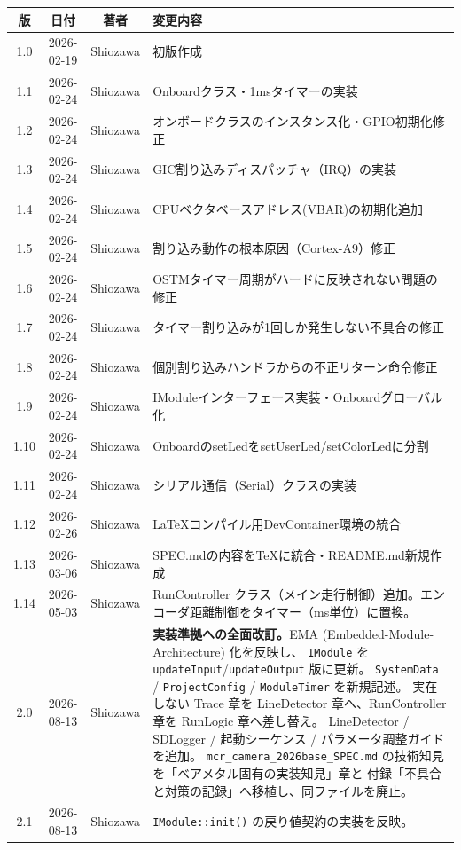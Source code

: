 \documentclass[a4paper,11pt,dvipdfmx]{jsarticle}
\begin{document}
\begin{tabularx}{\textwidth}{c c c X}
\toprule
\textbf{版} & \textbf{日付} & \textbf{著者} & \textbf{変更内容} \\
\midrule
1.0  & 2026-02-19 & Shiozawa & 初版作成 \\
1.1  & 2026-02-24 & Shiozawa & Onboardクラス・1msタイマーの実装 \\
1.2  & 2026-02-24 & Shiozawa & オンボードクラスのインスタンス化・GPIO初期化修正 \\
1.3  & 2026-02-24 & Shiozawa & GIC割り込みディスパッチャ（IRQ）の実装 \\
1.4  & 2026-02-24 & Shiozawa & CPUベクタベースアドレス(VBAR)の初期化追加 \\
1.5  & 2026-02-24 & Shiozawa & 割り込み動作の根本原因（Cortex-A9）修正 \\
1.6  & 2026-02-24 & Shiozawa & OSTMタイマー周期がハードに反映されない問題の修正 \\
1.7  & 2026-02-24 & Shiozawa & タイマー割り込みが1回しか発生しない不具合の修正 \\
1.8  & 2026-02-24 & Shiozawa & 個別割り込みハンドラからの不正リターン命令修正 \\
1.9  & 2026-02-24 & Shiozawa & IModuleインターフェース実装・Onboardグローバル化 \\
1.10 & 2026-02-24 & Shiozawa & OnboardのsetLedをsetUserLed/setColorLedに分割 \\
1.11 & 2026-02-24 & Shiozawa & シリアル通信（Serial）クラスの実装 \\
1.12 & 2026-02-26 & Shiozawa & LaTeXコンパイル用DevContainer環境の統合 \\
1.13 & 2026-03-06 & Shiozawa & SPEC.mdの内容をTeXに統合・README.md新規作成 \\
1.14 & 2026-05-03 & Shiozawa & RunController クラス（メイン走行制御）追加。エンコーダ距離制御をタイマー（ms単位）に置換。 \\
2.0  & 2026-08-13 & Shiozawa & \textbf{実装準拠への全面改訂。}EMA (Embedded-Module-Architecture) 化を反映し、
  \texttt{IModule} を \texttt{updateInput}/\texttt{updateOutput} 版に更新。
  \texttt{SystemData} / \texttt{ProjectConfig} / \texttt{ModuleTimer} を新規記述。
  実在しない Trace 章を LineDetector 章へ、RunController 章を RunLogic 章へ差し替え。
  LineDetector / SDLogger / 起動シーケンス / パラメータ調整ガイドを追加。
  \texttt{mcr\_camera\_2026base\_SPEC.md} の技術知見を「ベアメタル固有の実装知見」章と
  付録「不具合と対策の記録」へ移植し、同ファイルを廃止。 \\
2.1  & 2026-08-13 & Shiozawa & \texttt{IModule::init()} の戻り値契約の実装を反映。

\end{tabularx}
\end{document}

